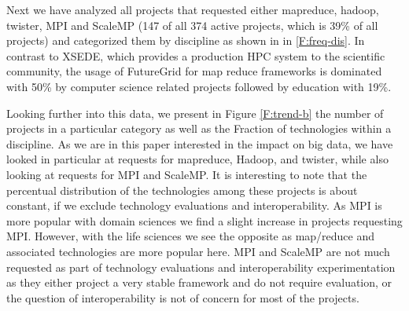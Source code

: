 \documentclass[graybox]{svmult}
\begin{document}




Next we have analyzed all projects that requested either mapreduce, hadoop, twister, MPI and ScaleMP (147 of all 374 active projects, which is 39\% of all projects) and categorized them by discipline as shown in in \ref{F:freq-dis}. In contrast to XSEDE, which provides a production HPC system to the scientific community, the usage of FutureGrid for map reduce frameworks is dominated with 50\% by computer science related projects followed by education with 19\%.




Looking further into this data, we present in Figure \ref{F:trend-b} the number of projects in a particular category as well as the Fraction of technologies within a discipline. As we are in this paper interested in the impact on big data, we have looked in particular at requests for mapreduce, Hadoop, and twister, while also looking at requests for MPI and ScaleMP. It is interesting to note that the percentual distribution of the technologies among these projects is about constant, if we exclude technology evaluations and interoperability. As MPI is more popular with domain sciences we find a slight increase in projects requesting MPI. However, with the life sciences we see the opposite as map/reduce and associated technologies are more popular here. MPI and ScaleMP are not much requested as part of technology evaluations and interoperability experimentation as they either project a very stable framework and do not require evaluation, or the question of interoperability is not of concern for most of the projects.  








\end{document}
